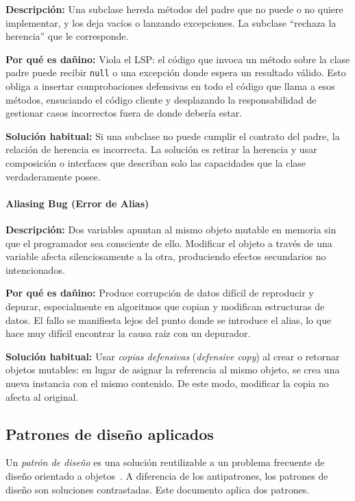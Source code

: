 \documentclass[11pt,a4paper]{article}
\newcommand{\code}[1]{\texttt{#1}}
\begin{document}
\textbf{Descripción:} Una subclase hereda métodos del padre que no puede o no
quiere implementar, y los deja vacíos o lanzando excepciones.  La subclase
``rechaza la herencia'' que le corresponde.

\textbf{Por qué es dañino:} Viola el LSP: el código que invoca un método sobre
la clase padre puede recibir \code{null} o una excepción donde espera un
resultado válido.  Esto obliga a insertar comprobaciones defensivas en todo el
código que llama a esos métodos, ensuciando el código cliente y desplazando la
responsabilidad de gestionar casos incorrectos fuera de donde debería estar.

\textbf{Solución habitual:} Si una subclase no puede cumplir el contrato del
padre, la relación de herencia es incorrecta.  La solución es retirar la herencia
y usar composición o interfaces que describan solo las capacidades que la clase
verdaderamente posee.

\label{sec:fund-alias-bug}
\paragraph{Aliasing Bug (Error de Alias)}

\textbf{Descripción:} Dos variables apuntan al mismo objeto mutable en memoria
sin que el programador sea consciente de ello.  Modificar el objeto a través de
una variable afecta silenciosamente a la otra, produciendo efectos secundarios
no intencionados.

\textbf{Por qué es dañino:} Produce corrupción de datos difícil de reproducir
y depurar, especialmente en algoritmos que copian y modifican estructuras de
datos.  El fallo se manifiesta lejos del punto donde se introduce el alias, lo
que hace muy difícil encontrar la causa raíz con un depurador.

\textbf{Solución habitual:} Usar \emph{copias defensivas} (\emph{defensive
copy}) al crear o retornar objetos mutables: en lugar de asignar la referencia
al mismo objeto, se crea una nueva instancia con el mismo contenido.  De este
modo, modificar la copia no afecta al original.

\subsection{Patrones de diseño aplicados}
\label{sec:fund-patrones}

Un \emph{patrón de diseño} es una solución reutilizable a un problema
frecuente de diseño orientado a objetos~\cite{gamma1995}.  A diferencia de los
antipatrones, los patrones de diseño son soluciones contrastadas.  Este
documento aplica dos patrones.
\end{document}
